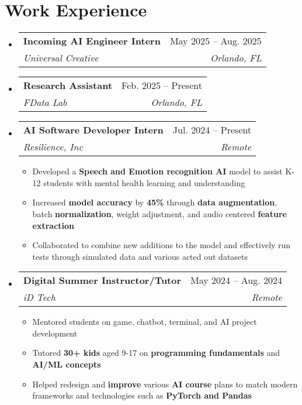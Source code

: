 \documentclass[letterpaper,11pt]{article}
\makeatletter
\newcommand{\resumeItem}[1]{
  \item\small{
    {#1 \vspace{-2pt}}
  }
}
\newcommand{\resumeSubheading}[4]{
  \vspace{-2pt}\item
    \begin{tabular*}{0.97\textwidth}[t]{l@{\extracolsep{\fill}}r}
      \textbf{#1} & #2 \\
      \textit{\small#3} & \textit{\small #4} \\
    \end{tabular*}\vspace{-7pt}
}
\newcommand{\resumeSubSubheading}[2]{
    \item
    \begin{tabular*}{0.97\textwidth}{l@{\extracolsep{\fill}}r}
      \textit{\small#1} & \textit{\small #2} \\
    \end{tabular*}\vspace{-7pt}
}
\newcommand{\resumeSubHeadingListStart}{\begin{itemize}[leftmargin=0.15in, label={}]}
\newcommand{\resumeSubHeadingListEnd}{\end{itemize}}
\newcommand{\resumeItemListStart}{\begin{itemize}}
\newcommand{\resumeItemListEnd}{\end{itemize}\vspace{-5pt}}
\makeatother
\begin{document}
\section{Work Experience}

  \resumeSubHeadingListStart
    \resumeSubheading
      {Incoming AI Engineer Intern}{May 2025 -- Aug. 2025}
      {Universal Creative}{Orlando, FL}

    \resumeSubheading
      {Research Assistant}{Feb. 2025 -- Present}
      {FData Lab}{Orlando, FL}

    \resumeSubheading
      {AI Software Developer Intern}{Jul. 2024 -- Present}
      {Resilience, Inc}{Remote}
      \resumeItemListStart
        \resumeItem{Developed a \textbf{Speech and Emotion recognition AI} model to assist K-12 students with mental health learning and understanding}
        \resumeItem{Increased \textbf{model accuracy} by \textbf{45\%} through \textbf{data augmentation}, batch \textbf{normalization}, weight adjustment, and audio centered \textbf{feature extraction}}
        \resumeItem{Collaborated to combine new additions to the model and effectively run tests through simulated data and various acted out datasets}
      \resumeItemListEnd

    \resumeSubheading
      {Digital Summer Instructor/Tutor}{May 2024 -- Aug. 2024}
      {iD Tech}{Remote}
      \resumeItemListStart
        \resumeItem{Mentored students on game, chatbot, terminal, and AI project development}
        \resumeItem{Tutored \textbf{30+ kids} aged 9-17 on \textbf{programming fundamentals} and \textbf{AI/ML concepts}}
        \resumeItem{Helped redesign and \textbf{improve} various \textbf{AI course} plans to match modern frameworks and technologies such as \textbf{PyTorch and Pandas}}
      \resumeItemListEnd
      
    


  \resumeSubHeadingListEnd


\end{document}
